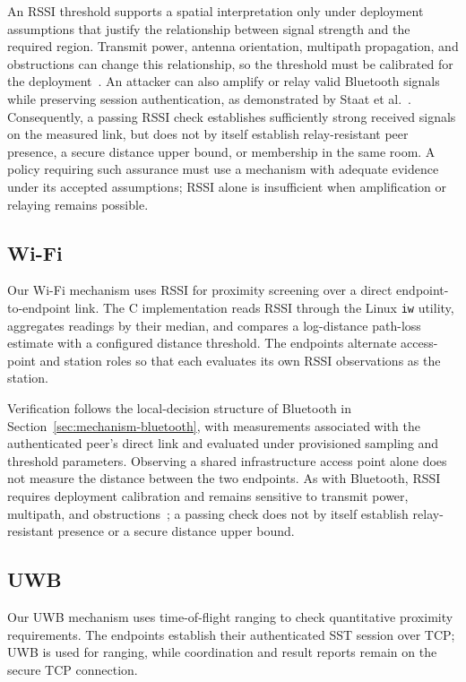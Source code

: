 \documentclass[sigconf,authordraft]{acmart}
\begin{document}
An RSSI threshold supports a spatial interpretation only under deployment assumptions that justify the relationship between signal strength and the required region.
Transmit power, antenna orientation, multipath propagation, and obstructions can change this relationship, so the threshold must be calibrated for the deployment~\cite{faragher2015location,giovanelli2018rssi}.
An attacker can also amplify or relay valid Bluetooth signals while preserving session authentication, as demonstrated by Staat et al.~\cite{staat2022analog}.
Consequently, a passing RSSI check establishes sufficiently strong received signals on the measured link, but does not by itself establish relay-resistant peer presence, a secure distance upper bound, or membership in the same room.
A policy requiring such assurance must use a mechanism with adequate evidence under its accepted assumptions; RSSI alone is insufficient when amplification or relaying remains possible.

\subsection{Wi-Fi}
\label{sec:mechanism-wifi}

Our Wi-Fi mechanism uses RSSI for proximity screening over a direct endpoint-to-endpoint link.
The C implementation reads RSSI through the Linux \texttt{iw} utility, aggregates readings by their median, and compares a log-distance path-loss estimate with a configured distance threshold.
The endpoints alternate access-point and station roles so that each evaluates its own RSSI observations as the station.

Verification follows the local-decision structure of Bluetooth in Section~\ref{sec:mechanism-bluetooth}, with measurements associated with the authenticated peer's direct link and evaluated under provisioned sampling and threshold parameters.
Observing a shared infrastructure access point alone does not measure the distance between the two endpoints.
As with Bluetooth, RSSI requires deployment calibration and remains sensitive to transmit power, multipath, and obstructions~\cite{bahl2000radar,kotaru2015spotfi}; a passing check does not by itself establish relay-resistant presence or a secure distance upper bound.

\subsection{UWB}
\label{sec:mechanism-uwb}

Our UWB mechanism uses time-of-flight ranging to check quantitative proximity requirements.
The endpoints establish their authenticated SST session over TCP; UWB is used for ranging, while coordination and result reports remain on the secure TCP connection.
\end{document}
